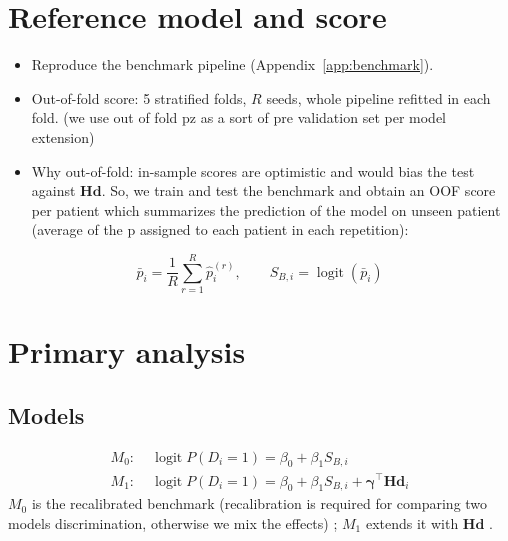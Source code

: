 \section{Reference model and score}
\label{sec:reference}
\begin{itemize}
    \item Reproduce the benchmark pipeline (Appendix~\ref{app:benchmark}).
    \item Out-of-fold score: 5 stratified folds, $R$ seeds, whole pipeline refitted in each fold. (we use out of fold pz as a sort of pre validation set per model extension)
    \item Why out-of-fold: in-sample scores are optimistic and would bias the test against $\mathbf{Hd}$. So, we train and test the benchmark and obtain an OOF score per patient which summarizes the prediction of the model on unseen patient (average of the p assigned to each patient in each repetition): 
\end{itemize}
\begin{equation}
    \bar{p}_i = \frac{1}{R}\sum_{r=1}^{R} \hat{p}_i^{(r)},
    \qquad
    S_{B,i} = \operatorname{logit}(\bar{p}_i)
\end{equation}

\section{Primary analysis}

\subsection{Models}
\begin{align}
    M_0:\;& \operatorname{logit} P(D_i = 1) = \beta_0 + \beta_1 S_{B,i} \\
    M_1:\;& \operatorname{logit} P(D_i = 1) = \beta_0 + \beta_1 S_{B,i} + \boldsymbol{\gamma}^{\top}\mathbf{Hd}_i
\end{align}
$M_0$ is the recalibrated benchmark (recalibration is required for comparing two models discrimination, otherwise we mix the effects) ; $M_1$ extends it with $\mathbf{Hd}$ \cite{janssen_updating_2008}.

